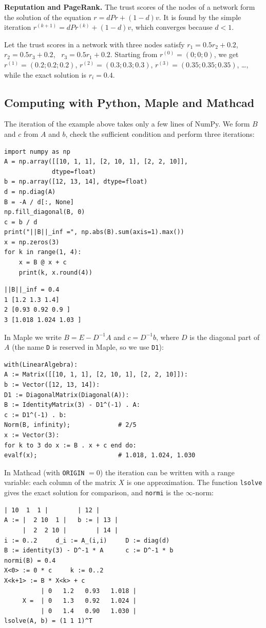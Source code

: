 \textbf{Reputation and PageRank.} The trust scores of the nodes of a network
form the solution of the equation $r=dPr+(1-d)v$. It is found by the simple
iteration $r^{(k+1)}=dPr^{(k)}+(1-d)v$, which converges because $d<1$.

\begin{misol}
Let the trust scores in a network with three nodes satisfy
$r_1=0.5r_2+0.2$, \ $r_2=0.5r_3+0.2$, \ $r_3=0.5r_1+0.2$.
Starting from $r^{(0)}=(0;0;0)$, we get $r^{(1)}=(0.2;0.2;0.2)$,
$r^{(2)}=(0.3;0.3;0.3)$, $r^{(3)}=(0.35;0.35;0.35)$, \dots, while the exact
solution is $r_i=0.4$.
\end{misol}

\subsection{Computing with Python, Maple and Mathcad}

The iteration of the example above takes only a few lines of NumPy. We form
$B$ and $c$ from $A$ and $b$, check the sufficient condition and perform
three iterations:
\begin{Verbatim}[fontsize=\footnotesize,frame=single,label={\small Python}]
import numpy as np
A = np.array([[10, 1, 1], [2, 10, 1], [2, 2, 10]],
             dtype=float)
b = np.array([12, 13, 14], dtype=float)
d = np.diag(A)
B = -A / d[:, None]
np.fill_diagonal(B, 0)
c = b / d
print("||B||_inf =", np.abs(B).sum(axis=1).max())
x = np.zeros(3)
for k in range(1, 4):
    x = B @ x + c
    print(k, x.round(4))
\end{Verbatim}
\begin{Verbatim}[fontsize=\footnotesize,frame=single,label={\small Output}]
||B||_inf = 0.4
1 [1.2 1.3 1.4]
2 [0.93 0.92 0.9 ]
3 [1.018 1.024 1.03 ]
\end{Verbatim}
In Maple we write $B=E-D^{-1}A$ and $c=D^{-1}b$, where $D$ is the diagonal
part of $A$ (the name \texttt{D} is reserved in Maple, so we use \texttt{D1}):
\begin{Verbatim}[fontsize=\footnotesize,frame=single,label={\small Maple}]
with(LinearAlgebra):
A := Matrix([[10, 1, 1], [2, 10, 1], [2, 2, 10]]):
b := Vector([12, 13, 14]):
D1 := DiagonalMatrix(Diagonal(A)):
B := IdentityMatrix(3) - D1^(-1) . A:
c := D1^(-1) . b:
Norm(B, infinity);             # 2/5
x := Vector(3):
for k to 3 do x := B . x + c end do:
evalf(x);                      # 1.018, 1.024, 1.030
\end{Verbatim}
In Mathcad (with \texttt{ORIGIN} $=0$) the iteration can be written with a
range variable: each column of the matrix $X$ is one approximation.
The function \texttt{lsolve} gives the exact solution for comparison, and
\texttt{normi} is the $\infty$-norm:
\begin{Verbatim}[fontsize=\footnotesize,frame=single,label={\small Mathcad}]
     | 10  1  1 |        | 12 |
A := |  2 10  1 |   b := | 13 |
     |  2  2 10 |        | 14 |
i := 0..2     d_i := A_(i,i)     D := diag(d)
B := identity(3) - D^-1 * A      c := D^-1 * b
normi(B) = 0.4
X<0> := 0 * c     k := 0..2
X<k+1> := B * X<k> + c
          | 0   1.2   0.93   1.018 |
     X =  | 0   1.3   0.92   1.024 |
          | 0   1.4   0.90   1.030 |
lsolve(A, b) = (1 1 1)^T
\end{Verbatim}

